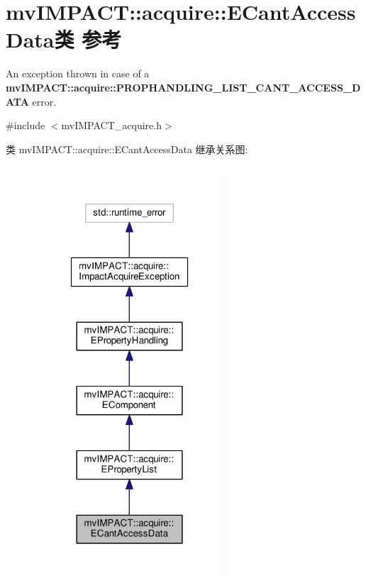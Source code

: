 \hypertarget{classmv_i_m_p_a_c_t_1_1acquire_1_1_e_cant_access_data}{\section{mv\+I\+M\+P\+A\+C\+T\+:\+:acquire\+:\+:E\+Cant\+Access\+Data类 参考}
\label{classmv_i_m_p_a_c_t_1_1acquire_1_1_e_cant_access_data}
}


An exception thrown in case of a {\bfseries mv\+I\+M\+P\+A\+C\+T\+::acquire\+::\+P\+R\+O\+P\+H\+A\+N\+D\+L\+I\+N\+G\+\_\+\+L\+I\+S\+T\+\_\+\+C\+A\+N\+T\+\_\+\+A\+C\+C\+E\+S\+S\+\_\+\+D\+A\+T\+A} error.  




{\ttfamily \#include $<$mv\+I\+M\+P\+A\+C\+T\+\_\+acquire.\+h$>$}



类 mv\+I\+M\+P\+A\+C\+T\+:\+:acquire\+:\+:E\+Cant\+Access\+Data 继承关系图\+:
\nopagebreak
\begin{figure}[H]
\begin{center}
\leavevmode
\includegraphics[width=202pt]{classmv_i_m_p_a_c_t_1_1acquire_1_1_e_cant_access_data__inherit__graph}
\end{center}
\end{figure}


